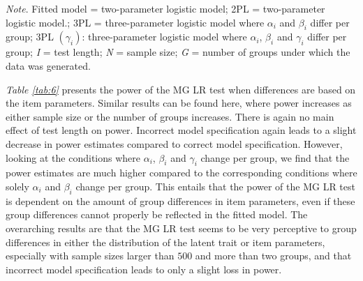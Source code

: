 \documentclass[Royal,sageapa,times,doublespace]{sagej}
\begin{document}
\begin{table}[ht!]
\bigskip
\small\textit{Note}. Fitted model = two-parameter logistic model; 2PL = two-parameter logistic model.; 3PL = three-parameter logistic model where $\alpha_i$ and $\beta_i$ differ per group; 3PL $ (\gamma_i)$: three-parameter logistic model where $\alpha_i$, $\beta_i$ and $\gamma_i$ differ per group; \textit{I} = test length; \textit{N} = sample size; \textit{G} = number of groups under which the data was generated.
\label{tab:6}
\end{table}

\indent \textit{Table \ref{tab:6}} presents the power of the MG LR test when differences are based on the item parameters. Similar results can be found here, where power increases as either sample size or the number of groups increases. There is again no main effect of test length on power. Incorrect model specification again leads to a slight decrease in power estimates compared to correct model specification. However, looking at the conditions where $\alpha_i$, $\beta_i$ and $\gamma_i$ change per group, we find that the power estimates are much higher compared to the corresponding conditions where solely $\alpha_i$ and $\beta_i$ change per group. This entails that the power of the MG LR test is dependent on the amount of group differences in item parameters, even if these group differences cannot properly be reflected in the fitted model. The overarching results are that the MG LR test seems to be very perceptive to group differences in either the distribution of the latent trait or item parameters, especially with sample sizes larger than $500$ and more than two groups, and that incorrect model specification leads to only a slight loss in power.
\end{document}
